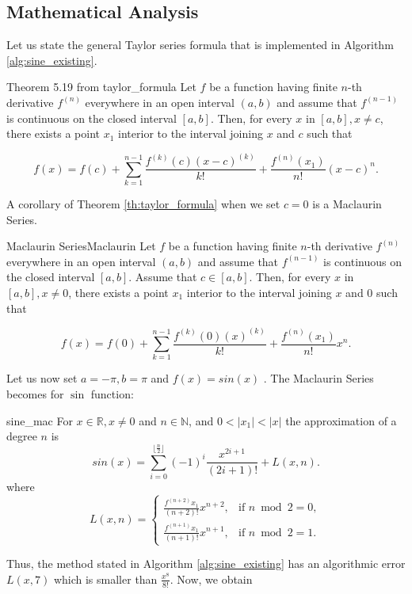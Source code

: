 \documentclass[12pt]{article}
\begin{document}
\subsection{Mathematical Analysis}
Let us state the general Taylor series formula that is implemented in Algorithm \ref{alg:sine_existing}.
\begin{TheoremColor}{Theorem 5.19 from }{taylor_formula}
    Let $f$ be a function having finite $n$-th derivative $f^{(n)}$
    everywhere in an open interval $(a, b)$ and assume that  $f^{(n-1)}$ is continuous on the closed interval $[a, b]$. Then, for every $x$ in $[a, b], x\neq c$, there exists a point $x_1$ interior to the interval joining $x$ and $c$ such that

    \begin{equation*}
        f(x) = f(c) + \sum_{k=1}^{n-1} \frac{f^{(k)}(c)(x-c)^{(k)}}{k!} + \frac{f^{(n)}(x_1)}{n!} (x - c)^n.
    \end{equation*}
\end{TheoremColor}
A corollary of Theorem \ref{th:taylor_formula} when we set $c = 0$ is a Maclaurin Series.
\begin{CorollaryColor}{Maclaurin Series}{Maclaurin}
    Let $f$ be a function having finite $n$-th derivative $f^{(n)}$
    everywhere in an open interval $(a, b)$ and assume that  $f^{(n-1)}$ is continuous on the closed interval $[a, b]$. Assume that $c \in [a, b]$. Then, for every $x$ in $[a, b], x\neq 0$, there exists a point $x_1$ interior to the interval joining $x$ and $0$ such that

    \begin{equation*}
        f(x) = f(0) + \sum_{k=1}^{n-1} \frac{f^{(k)}(0)(x)^{(k)}}{k!} + \frac{f^{(n)}(x_1)}{n!} x^n.
    \end{equation*}
\end{CorollaryColor}
Let us now set $a = -\pi, b= \pi$ and $f(x) = sin(x)$ .
The Maclaurin Series becomes for $\sin$ function:
\begin{CorollaryColor}{}{sine_mac}
    For $x \in \mathbb{R}, x\neq 0$ and $n \in \mathbb{N}$, and $0 < |x_1| < |x|$
    the approximation of a degree $n$ is
    \begin{equation*}
        sin(x) = \sum_{i=0}^{\lfloor\frac{n}{2}\rfloor}
        \left(-1\right)^{ i} \frac{x^{2i + 1}}{(2i+1)!}   +  L(x, n).
    \end{equation*}
    where
    \begin{equation*}
        L(x, n) = \begin{cases}
            \frac{f^{(n + 2)}x_1}{(n+2)!}x^{n+2}, & \text{if } n \bmod 2 = 0,  \\
            \frac{f^{(n + 1)}x_1}{(n+1)!}x^{n+1}, & \text{if } n \bmod 2 = 1.
          \end{cases}
    \end{equation*}
\end{CorollaryColor}
Thus, the method stated in Algorithm \ref{alg:sine_existing} has an algorithmic error $L(x, 7)$ which is smaller than $\frac{x^8}{8!}$.
Now, we obtain
\end{document}
